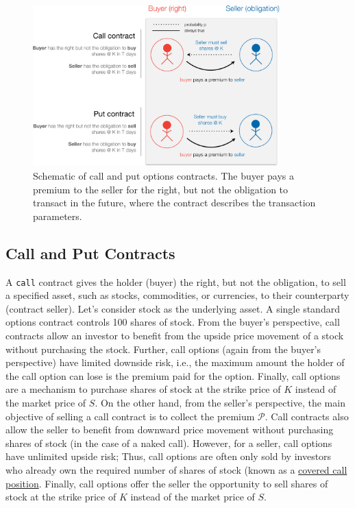 \documentclass[11pt]{article}
\theoremstyle{definition}
\begin{document}
\begin{figure}[ht]
    \centering
    \includegraphics[width=0.85\textwidth]{./figs/Fig-Options-Table-Schematic.pdf}
    \caption{Schematic of call and put options contracts. The buyer pays a premium to the seller for the right, but 
	not the obligation to transact in the future, where the contract describes the transaction parameters.}\label{fig:options-schematic}
\end{figure}

\subsection*{Call and Put Contracts}
A \texttt{call} contract gives the holder (buyer) the right, but not the obligation, to sell a specified asset, 
such as stocks, commodities, or currencies, to their counterparty (contract seller). 
Let's consider stock as the underlying asset. A single standard options contract controls 100 shares of stock. 
From the buyer's perspective, call contracts allow an investor to benefit from the upside price movement of a stock without purchasing the stock.
Further, call options (again from the buyer's perspective) have limited downside risk, i.e., the maximum amount the holder of the call option can lose 
is the premium paid for the option. Finally, call options are a mechanism to purchase shares of stock at the strike price of $K$ instead of the market price of $S$. 
On the other hand, from the seller's perspective, the main objective of selling a call contract is to collect the premium $\mathcal{P}$. 
Call contracts also allow the seller to benefit from downward price movement without purchasing shares of stock (in the case of a naked call).
However, for a seller, call options have unlimited upside risk; 
Thus, call options are often only sold by investors who already own the required number of shares of stock 
(known as a \href{https://www.investopedia.com/terms/c/coveredcall.asp}{covered call position}. 
Finally, call options offer the seller the opportunity to sell shares of stock at the strike price of $K$ instead of the market price of $S$.
\end{document}
